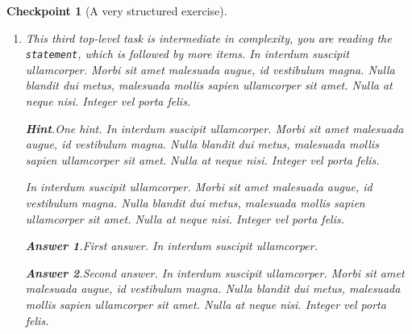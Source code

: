 \documentclass{sn-jnl}
\theoremstyle{thmstyleone}%
\theoremstyle{thmstyletwo}%
\newtheorem{inlineexercise}[theorem]{Checkpoint}
\theoremstyle{thmstylethree}%
\newcommand{\blocktitlefont}{\relax}
\newcommand{\mono}[1]{\texttt{#1}}
\numberwithin{equation}{section}
\begin{document}
\begin{inlineexercise}[A very structured exercise]
\begin{enumerate}[font=\bfseries,label=(\alph*),ref=\alph*]
\begin{enumerate}[font=\bfseries,label=(\roman*),ref=\theenumi.\roman*]
\begin{enumerate}[font=\bfseries,label=(\Alph*),ref=\theenumi.\theenumii.\Alph*]
\par
In interdum suscipit ullamcorper%
\par
In interdum suscipit ullamcorper. Morbi sit amet malesuada augue, id vestibulum magna. Nulla blandit dui metus, malesuada mollis sapien ullamcorper sit amet. Nulla at neque nisi. Integer vel porta felis.%
\end{enumerate}%
The conclusion of the structured subtask.  In interdum suscipit ullamcorper. Morbi sit amet malesuada augue, id vestibulum magna. Nulla blandit dui metus, malesuada mollis sapien ullamcorper sit amet. Nulla at neque nisi. Integer vel porta felis.%
\item{}A simple task as the last subtask.  In interdum suscipit ullamcorper. Morbi sit amet malesuada augue, id vestibulum magna. Nulla blandit dui metus, malesuada mollis sapien ullamcorper sit amet. Nulla at neque nisi. Integer vel porta felis.%
\end{enumerate}%
This concludes our structured second task.  In interdum suscipit ullamcorper. Morbi sit amet malesuada augue, id vestibulum magna. Nulla blandit dui metus, malesuada mollis sapien ullamcorper sit amet. Nulla at neque nisi. Integer vel porta felis.%
\item{}This third top-level task is intermediate in complexity, you are reading the \mono{statement}, which is followed by more items. In interdum suscipit ullamcorper. Morbi sit amet malesuada augue, id vestibulum magna. Nulla blandit dui metus, malesuada mollis sapien ullamcorper sit amet. Nulla at neque nisi. Integer vel porta felis.%
\par\smallskip%
\noindent\textbf{\blocktitlefont Hint}.\hypertarget{exercise-structured-6-2}{}\quad{}One hint.  In interdum suscipit ullamcorper. Morbi sit amet malesuada augue, id vestibulum magna. Nulla blandit dui metus, malesuada mollis sapien ullamcorper sit amet. Nulla at neque nisi. Integer vel porta felis.%
\par
In interdum suscipit ullamcorper. Morbi sit amet malesuada augue, id vestibulum magna. Nulla blandit dui metus, malesuada mollis sapien ullamcorper sit amet. Nulla at neque nisi. Integer vel porta felis.%
\par\smallskip%
\noindent\textbf{\blocktitlefont Answer 1}.\hypertarget{exercise-structured-6-3}{}\quad{}First answer.  In interdum suscipit ullamcorper.%
\par\smallskip%
\noindent\textbf{\blocktitlefont Answer 2}.\hypertarget{exercise-structured-6-4}{}\quad{}Second answer.  In interdum suscipit ullamcorper. Morbi sit amet malesuada augue, id vestibulum magna. Nulla blandit dui metus, malesuada mollis sapien ullamcorper sit amet. Nulla at neque nisi. Integer vel porta felis.%

\end{enumerate}
\end{inlineexercise}
\end{document}
